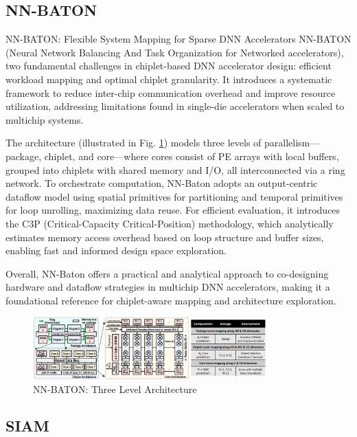 \documentclass[acmsmall]{acmart}
\begin{document}
\subsection{NN-BATON}

NN-BATON: Flexible System Mapping for Sparse DNN Accelerators
NN-BATON (Neural Network Balancing And Task Organization for Networked accelerators), two fundamental challenges in chiplet-based DNN accelerator design: efficient workload mapping and optimal chiplet granularity. It introduces a systematic framework to reduce inter-chip communication overhead and improve resource utilization, addressing limitations found in single-die accelerators when scaled to multichip systems.

The architecture (illustrated in Fig. \ref{fig:nnBatonArchitecture}) models three levels of parallelism—package, chiplet, and core—where cores consist of PE arrays with local buffers, grouped into chiplets with shared memory and I/O, all interconnected via a ring network. To orchestrate computation, NN-Baton adopts an output-centric dataflow model using spatial primitives for partitioning and temporal primitives for loop unrolling, maximizing data reuse. For efficient evaluation, it introduces the C3P (Critical-Capacity Critical-Position) methodology, which analytically estimates memory access overhead based on loop structure and buffer sizes, enabling fast and informed design space exploration.

Overall, NN-Baton offers a practical and analytical approach to co-designing hardware and dataflow strategies in multichip DNN accelerators, making it a foundational reference for chiplet-aware mapping and architecture exploration.


\begin{figure}[h]
  \centering
  \includegraphics[width=0.8\textwidth]{figures/nnBatonArchitecture.png}
  \caption{NN-BATON: Three Level Architecture \cite{nnBaton}}
  \label{fig:nnBatonArchitecture}
\end{figure}

\subsection{SIAM}
\end{document}
